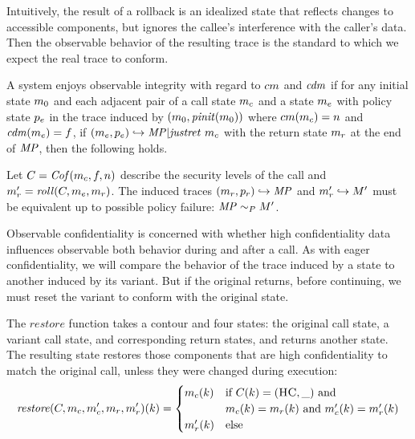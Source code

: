 \documentclass[acmsmall,review,anonymous]{acmart}\settopmatter{printfolios=true,printccs=false,printacmref=false}
\begin{document}
      Intuitively, the result of a rollback is an idealized state that
      reflects changes to accessible components, but ignores the callee's
      interference with the caller's data. Then the observable behavior of the
      resulting trace is the standard to which we expect the real trace to
      conform.

      A system enjoys observable integrity with regard to \(cm\) and
      \(\mathit{cdm}\) if for any initial state \(m_0\) and each adjacent pair
      of a call state \(m_c\) and a state \(m_e\) with policy state
      \(p_e\) in the trace induced by
      \((m_0,\mathit{pinit}(m_0))\) where
      \(cm(m_c) = n\) and \(\mathit{cdm}(m_e) = f\),
      if \((m_e,p_e) \hookrightarrow \mathit{MP} | \mathit{justret}\ m_c\)
      with the return state \(m_r\) at the end of \(\mathit{MP}\), then the
      following holds.

      Let \(C = \mathit{Cof}(m_c,f,n)\) describe the security
      levels of the call and
      \(m_r' = \mathit{roll}(C,m_e,m_r)\). The induced
      traces \((m_r,p_r) \hookrightarrow \mathit{MP}\) and
      \(m_r' \hookrightarrow M'\) must be equivalent up to
      possible policy failure: \(\mathit{MP} \sim_P M'\).

      Observable confidentiality is concerned with whether high confidentiality
      data influences observable both behavior during and after a call. As with
      eager confidentiality, we will compare the behavior of the trace induced
      by a state to another induced by its variant. But if the original returns,
      before continuing, we must reset the variant to conform with the original
      state.

      The \(\mathit{restore}\) function takes a contour and four states: the
      original call state, a variant call state, and corresponding return
      states, and returns another state. The resulting state restores those
      components that are high confidentiality to match the original call,
      unless they were changed during execution:
      \[\mathit{restore}(C,m_c,m_c',m_r,m_r')(k) =
        \begin{cases}
          m_c(k) & \text{if } C(k) = (\textsc{HC},\_) \text{ and } \\
                  & m_c(k) = m_r(k) \text{ and }
                    m_c'(k) = m_r'(k) \\
          m_r'(k) & \text{else} \\
        \end{cases}\]
\end{document}

